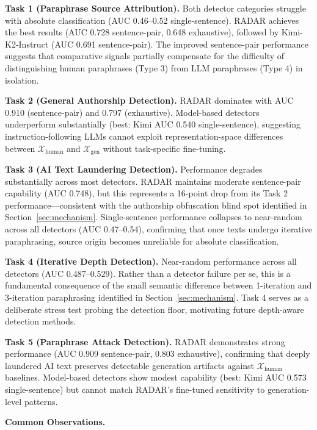 \documentclass[runningheads]{llncs}
\begin{document}
\noindent\textbf{Task 1 (Paraphrase Source Attribution).}
Both detector categories struggle with absolute classification (AUC 
0.46--0.52 single-sentence). RADAR achieves the best results (AUC 
0.728 sentence-pair, 0.648 exhaustive), followed by Kimi-K2-Instruct 
(AUC 0.691 sentence-pair). The improved sentence-pair performance 
suggests that comparative signals partially compensate for the 
difficulty of distinguishing human paraphrases (Type 3) from LLM 
paraphrases (Type 4) in isolation.

\noindent\textbf{Task 2 (General Authorship Detection).}
RADAR dominates with AUC 0.910 (sentence-pair) and 0.797 (exhaustive). 
Model-based detectors underperform substantially (best: Kimi AUC 0.540 
single-sentence), suggesting instruction-following LLMs cannot exploit 
representation-space differences between $\mathcal{X}_{\text{human}}$ 
and $\mathcal{X}_{\text{gen}}$ without task-specific fine-tuning.

\noindent\textbf{Task 3 (AI Text Laundering Detection).}
Performance degrades substantially across most detectors. RADAR 
maintains moderate sentence-pair capability (AUC 0.748), but this 
represents a 16-point drop from its Task 2 performance---consistent 
with the authorship obfuscation blind spot identified in 
Section~\ref{sec:mechanism}. Single-sentence performance collapses 
to near-random across all detectors (AUC 0.47--0.54), confirming that 
once texts undergo iterative paraphrasing, source origin becomes 
unreliable for absolute classification.

\noindent\textbf{Task 4 (Iterative Depth Detection).}
Near-random performance across all detectors (AUC 0.487--0.529). 
Rather than a detector failure per se, this is a fundamental 
consequence of the small semantic difference between 1-iteration and 
3-iteration paraphrasing identified in Section~\ref{sec:mechanism}. 
Task 4 serves as a deliberate stress test probing the detection floor, 
motivating future depth-aware detection methods.

\noindent\textbf{Task 5 (Paraphrase Attack Detection).}
RADAR demonstrates strong performance (AUC 0.909 sentence-pair, 0.803 
exhaustive), confirming that deeply laundered AI text preserves 
detectable generation artifacts against $\mathcal{X}_{\text{human}}$ 
baselines. Model-based detectors show modest capability (best: Kimi 
AUC 0.573 single-sentence) but cannot match RADAR's fine-tuned 
sensitivity to generation-level patterns.

\noindent\textbf{Common Observations.}
\end{document}
